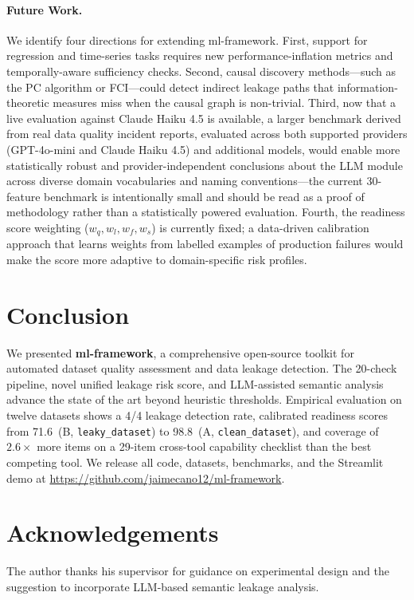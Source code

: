 \documentclass[11pt]{article}
\begin{document}
\paragraph{Future Work.}
We identify four directions for extending ml-framework.  First, support for
regression and time-series tasks requires new performance-inflation metrics
and temporally-aware sufficiency checks.  Second, causal discovery
methods---such as the PC algorithm or FCI---could detect indirect leakage
paths that information-theoretic measures miss when the causal graph is
non-trivial.  Third, now that a live evaluation against Claude Haiku 4.5 is
available, a larger
benchmark derived from real data quality incident reports, evaluated across
both supported providers (GPT-4o-mini and Claude Haiku 4.5) and additional
models, would enable more
statistically robust and provider-independent conclusions about the LLM module across diverse domain
vocabularies and naming conventions---the current 30-feature benchmark is
intentionally small and should be read as a proof of methodology rather
than a statistically powered evaluation.  Fourth, the readiness score
weighting ($w_q, w_l, w_f, w_s$) is currently fixed; a data-driven
calibration approach that learns weights from labelled examples of
production failures would make the score more adaptive to domain-specific
risk profiles.

\section{Conclusion}
\label{sec:conclusion}

We presented \textbf{ml-framework}, a comprehensive open-source toolkit for
automated dataset quality assessment and data leakage detection.  The
20-check pipeline, novel unified leakage risk score, and LLM-assisted
semantic analysis advance the state of the art beyond heuristic thresholds.
Empirical evaluation on twelve datasets shows a 4/4 leakage detection rate,
calibrated readiness scores from 71.6~(B, \texttt{leaky\_dataset}) to
98.8~(A, \texttt{clean\_dataset}), and coverage of $2.6\times$ more items on
a 29-item cross-tool capability checklist than the best competing tool.  We
release all code, datasets, benchmarks, and the Streamlit demo at
\url{https://github.com/jaimecano12/ml-framework}.

\section*{Acknowledgements}
The author thanks his supervisor for guidance on experimental design and the
suggestion to incorporate LLM-based semantic leakage analysis.
\end{document}

